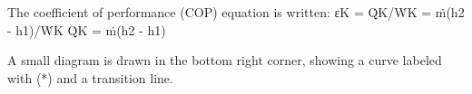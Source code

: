 The coefficient of performance (COP) equation is written:  
εK = Q̇K/ẆK = ṁ(h2 - h1)/ẆK  
Q̇K = ṁ(h2 - h1)  

A small diagram is drawn in the bottom right corner, showing a curve labeled with (*) and a transition line.